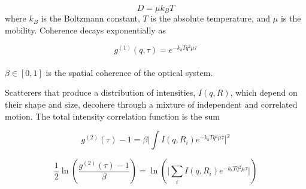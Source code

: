 \documentclass{article}
\begin{document}
\begin{equation}\label{Einstein}
    D = \mu k_B T
\end{equation}
where $k_B$ is the Boltzmann constant, $T$ is the absolute temperature, and $\mu$ is the mobility. Coherence decays exponentially as

\begin{equation}\label{g1_mono}
    g^{(1)}(q, \tau) = e^{-k_b T q^2 \mu \tau}
\end{equation}
\\
$\beta \in [0,1]$ is the spatial coherence of the optical system. 

Scatterers that produce a distribution of intensities, $I(q,R)$, which depend on their shape and size, decohere through a mixture of independent and correlated motion. The total intensity correlation function is the sum 

\begin{equation}\label{g2_polydisperse}
    g^{(2)}(\tau) - 1 = \beta \Big\vert \int I(q,R_i) e^{-k_b T q^2 \mu \tau} \Big\vert^2
\end{equation}

\begin{equation}\label{g2_log}
    \frac{1}{2}\ln \left( \frac{g^{(2)}(\tau) - 1}{\beta} \right) = \ln \left(\Big\vert \sum_i I(q,R_i) e^{-k_b T q^2 \mu \tau} \Big\vert \right)
\end{equation}
\end{document}
